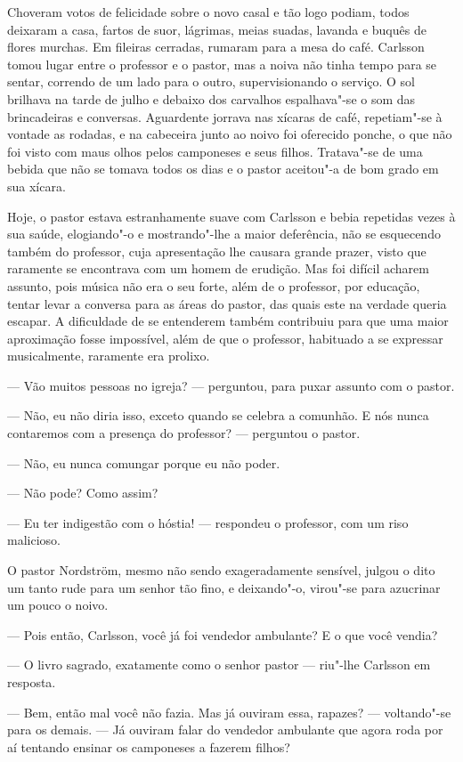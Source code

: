 Choveram votos de felicidade sobre o novo casal e tão logo podiam, todos
deixaram a casa, fartos de suor, lágrimas, meias suadas, lavanda e buquês de
flores murchas. Em fileiras cerradas, rumaram para a mesa do café. Carlsson
tomou lugar entre o professor e o pastor, mas a noiva não tinha tempo para se
sentar, correndo de um lado para o outro, supervisionando o serviço. O sol brilhava na
tarde de julho e debaixo dos carvalhos espalhava"-se o som das brincadeiras e
conversas. Aguardente jorrava nas xícaras de café, repetiam"-se à vontade as
rodadas, e na cabeceira junto ao noivo foi oferecido ponche, o que não foi visto
com maus olhos pelos camponeses e seus filhos. Tratava"-se de uma bebida que não se
tomava todos os dias e o pastor aceitou"-a de bom grado em sua xícara.

 Hoje, o pastor estava estranhamente suave com Carlsson e bebia repetidas vezes à sua
 saúde, elogiando"-o e mostrando"-lhe a maior deferência, não se esquecendo também
 do professor, cuja apresentação lhe causara grande prazer, visto que 
 raramente se encontrava com um homem de erudição. Mas foi difícil acharem
 assunto, pois música não era o seu forte, além de o professor, por educação, tentar
 levar a conversa para as áreas do pastor, das quais este na verdade queria
 escapar. A dificuldade de se entenderem também contribuiu para que uma maior
 aproximação fosse impossível, além de que o professor, habituado a se
 expressar musicalmente, raramente era prolixo.

--- Vão muitos pessoas no igreja? --- perguntou, para puxar assunto com o pastor.

--- Não, eu não diria isso, exceto quando se celebra a comunhão. E nós nunca
contaremos com a presença do professor? --- perguntou o pastor.

--- Não, eu nunca comungar porque eu não poder.

--- Não pode? Como assim?

--- Eu ter indigestão com o hóstia! --- respondeu o professor, com um riso malicioso.

O pastor Nordström, mesmo não sendo exageradamente sensível, julgou o dito um tanto rude
para um senhor tão fino, e deixando"-o, virou"-se para azucrinar um pouco o noivo.

--- Pois então, Carlsson, você já foi vendedor ambulante? E o que você vendia?

--- O livro sagrado, exatamente como o senhor pastor --- riu"-lhe Carlsson em
resposta.

--- Bem, então mal você não fazia. Mas já ouviram essa, rapazes? --- 
voltando"-se para os demais. --- Já ouviram falar do vendedor ambulante que agora roda
por aí tentando ensinar os camponeses a fazerem filhos?

